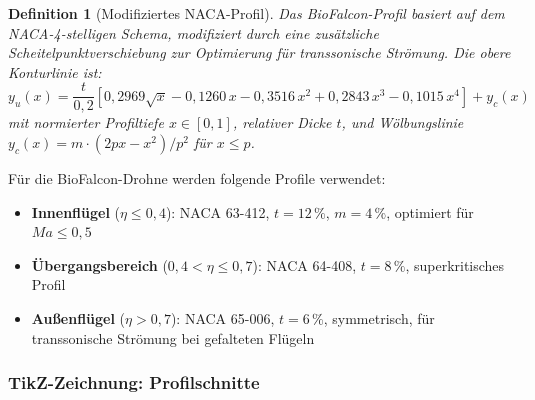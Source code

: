 ﻿\documentclass[12pt,a4paper]{article}
\newtheorem{definition}{Definition}[section]
\theoremstyle{remark}
\begin{document}
	\begin{definition}[Modifiziertes NACA-Profil]
		\label{def:naca}
		Das BioFalcon-Profil basiert auf dem NACA-4-stelligen Schema, modifiziert durch
		eine zusätzliche Scheitelpunktverschiebung zur Optimierung für transsonische
		Strömung.  Die obere Konturlinie ist:
		\begin{equation}
			y_u(x) = \frac{t}{0{,}2} \left[0{,}2969\sqrt{x}
			- 0{,}1260\,x - 0{,}3516\,x^2 + 0{,}2843\,x^3 - 0{,}1015\,x^4\right]
			+ y_c(x)
			\label{eq:naca_upper}
		\end{equation}
		mit normierter Profiltiefe $x \in [0,1]$, relativer Dicke $t$, und Wölbungslinie
		$y_c(x) = m \cdot (2px - x^2)/p^2$ für $x \leq p$.
	\end{definition}
	
	Für die BioFalcon-Drohne werden folgende Profile verwendet:
	\begin{itemize}
		\item \textbf{Innenflügel} ($\eta \leq 0{,}4$): NACA 63-412,
		$t = 12\,\%$, $m = 4\,\%$, optimiert für $Ma \leq 0{,}5$
		\item \textbf{Übergangsbereich} ($0{,}4 < \eta \leq 0{,}7$): NACA 64-408,
		$t = 8\,\%$, superkritisches Profil
		\item \textbf{Außenflügel} ($\eta > 0{,}7$): NACA 65-006, $t = 6\,\%$,
		symmetrisch, für transsonische Strömung bei gefalteten Flügeln
	\end{itemize}
	
	\subsubsection{TikZ-Zeichnung: Profilschnitte}
	
\end{document}
